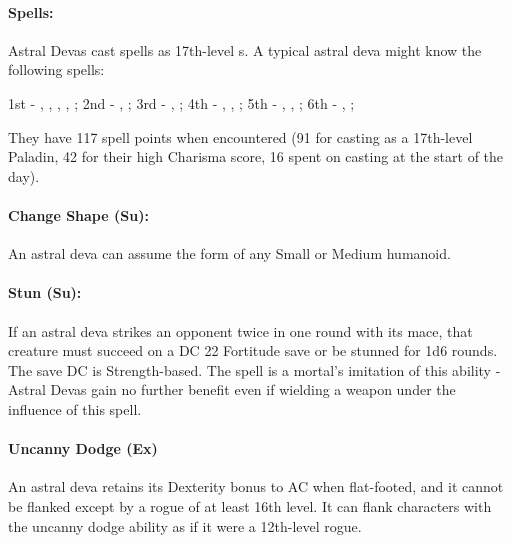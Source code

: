 \paragraph{Spells:} Astral Devas cast spells as 17th-level s. A typical astral deva might know the following spells:

1st - , , , , ;
2nd - , ;
3rd -  , ;
4th - , , ;
5th - , , ;
6th - , ;

They have 117 spell points when encountered (91 for casting as a 17th-level Paladin, 42 for their high Charisma score, 16 spent on casting  at the start of the day).
\paragraph{Change Shape (Su):}
An astral deva can assume the form of any Small or Medium humanoid.

\paragraph{Stun (Su):}
If an astral deva strikes an opponent twice in one round with its mace, that creature must succeed on a DC 22 Fortitude save or be stunned for 1d6 rounds. The save DC is Strength-based. The  spell is a mortal's imitation of this ability - Astral Devas gain no further benefit even if wielding a weapon under the influence of this spell.
\paragraph{Uncanny Dodge (Ex)}
An astral deva retains its Dexterity bonus to AC when flat-footed, and it cannot be flanked except by a rogue of at least 16th level. It can flank characters with the uncanny dodge ability as if it were a 12th-level rogue. 


